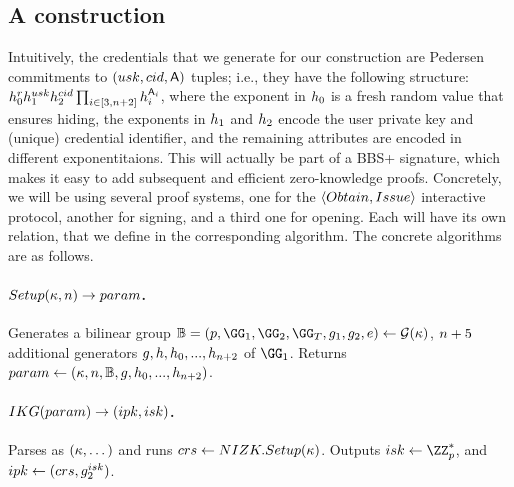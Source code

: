 


\subsection{A \GSAC construction}
\label{ssec:construction-gsac}

Intuitively, the credentials that we generate for our \GSAC construction are
Pedersen commitments to $(usk,cid,\mathsf{A})$ tuples; i.e., they have
the following structure: $h_0^rh_1^{usk}h_2^{cid}
\prod_{i \in [3,n+2]}h_i^{\mathsf{A}_i}$, where the exponent in
$h_0$ is a fresh random value that ensures hiding, the exponents in
$h_1$ and $h_2$ encode the user private key and (unique) credential
identifier, and the remaining attributes are encoded in different
exponentitaions. This will actually be part of a BBS+ signature, which makes it
easy to add subsequent and efficient zero-knowledge proofs. Concretely, we will
be using several \NIZK proof systems, one for the $\langle Obtain,Issue
\rangle$ interactive protocol, another for signing, and a third one for opening.
Each will have its own relation, that we define in the corresponding algorithm.
The concrete algorithms are as follows.

\paragraph{$Setup(\kappa,n) \rightarrow param$.} %
Generates a bilinear group $\BB = (p,\GG_1,\GG_2,\GG_T,\gen{g}_1,\gen{g}_2,e) \gets
\PGen(\secpar)$, $n+5$ additional generators $g,h,h_0,...,
h_{n+2}$ of $\GG_1$. Returns $param \gets
(\kappa,n,\mathbb{B},g,h_0,...,h_{n+2})$.

\paragraph{$IKG(param) \rightarrow (ipk,isk)$.} %
Parses \parm as $(\kappa,\dots)$ and runs $crs \gets NIZK.Setup(\kappa)$.
Outputs $\isk \gets \ZZ^*_p$, and $ipk \gets (crs,g_2^{isk})$.


